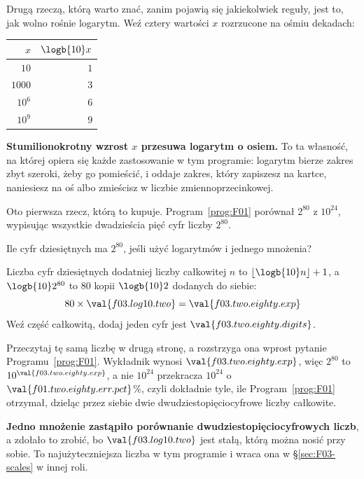 \begin{fr}
Drugą rzeczą, którą warto znać, zanim pojawią się jakiekolwiek reguły, jest to,
jak wolno rośnie logarytm. Weź cztery wartości $x$ rozrzucone na ośmiu
dekadach:

\begin{center}
\begin{tabular}{rr}
\toprule
$x$ & $\logb{10} x$ \\
\midrule
$10$ & $1$ \\
$1000$ & $3$ \\
$10^{6}$ & $6$ \\
$10^{9}$ & $9$ \\
\bottomrule
\end{tabular}
\end{center}

\textbf{Stumilionokrotny wzrost $x$ przesuwa logarytm o osiem.} To ta własność,
na której opiera się każde zastosowanie w tym programie: logarytm bierze
zakres zbyt szeroki, żeby go pomieścić, i oddaje zakres, który zapiszesz na
kartce, naniesiesz na oś albo zmieścisz w liczbie zmiennoprzecinkowej.

Oto pierwsza rzecz, którą to kupuje. Program~\ref{prog:F01} porównał $2^{80}$ z
$10^{24}$, wypisując wszystkie dwadzieścia pięć cyfr liczby $2^{80}$.

Ile cyfr dziesiętnych ma $2^{80}$, jeśli użyć logarytmów i jednego mnożenia?
\nextframe
\end{fr}

\begin{fr}
Liczba cyfr dziesiętnych dodatniej liczby całkowitej $n$ to
$\lfloor \logb{10} n \rfloor + 1$, a $\logb{10} 2^{80}$ to $80$ kopii
$\logb{10} 2$ dodanych do siebie:
\[ 80 \times \val{f03.log10.two} = \val{f03.two.eighty.exp} \]
Weź część całkowitą, dodaj jeden \dash{} cyfr jest
$\val{f03.two.eighty.digits}$.

Przeczytaj tę samą liczbę w drugą stronę, a rozstrzyga ona wprost pytanie
Programu~\ref{prog:F01}. Wykładnik wynosi $\val{f03.two.eighty.exp}$, więc
$2^{80}$ to $10^{\val{f03.two.eighty.exp}}$, a nie $10^{24}$ \dash{} przekracza
$10^{24}$ o $\val{f01.two.eighty.err.pct}$\%, czyli dokładnie tyle, ile
Program~\ref{prog:F01} otrzymał, dzieląc przez siebie dwie
dwudziestopięciocyfrowe liczby całkowite.

\textbf{Jedno mnożenie zastąpiło porównanie dwudziestopięciocyfrowych liczb},
a zdołało to zrobić, bo $\val{f03.log10.two}$ jest stałą, którą można nosić przy
sobie. To najużyteczniejsza liczba w tym programie i wraca ona w
\S\ref{sec:F03-scales} w innej roli.
\end{fr}

